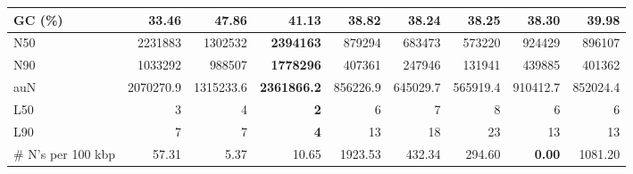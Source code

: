 \documentclass[12pt,a4paper]{article}
\begin{document}
\begin{table}[ht]
\begin{center}
\begin{tabular}{|l*{8}{|r}|}
GC (\%) & 33.46 & 47.86 & 41.13 & 38.82 & 38.24 & 38.25 & 38.30 & 39.98 \\ \hline
N50 & 2231883 & 1302532 & {\bf 2394163} & 879294 & 683473 & 573220 & 924429 & 896107 \\ \hline
N90 & 1033292 & 988507 & {\bf 1778296} & 407361 & 247946 & 131941 & 439885 & 401362 \\ \hline
auN & 2070270.9 & 1315233.6 & {\bf 2361866.2} & 856226.9 & 645029.7 & 565919.4 & 910412.7 & 852024.4 \\ \hline
L50 & 3 & 4 & {\bf 2} & 6 & 7 & 8 & 6 & 6 \\ \hline
L90 & 7 & 7 & {\bf 4} & 13 & 18 & 23 & 13 & 13 \\ \hline
\# N's per 100 kbp & 57.31 & 5.37 & 10.65 & 1923.53 & 432.34 & 294.60 & {\bf 0.00} & 1081.20 \\ \hline
\end{tabular}
\end{center}
\end{table}
\end{document}
